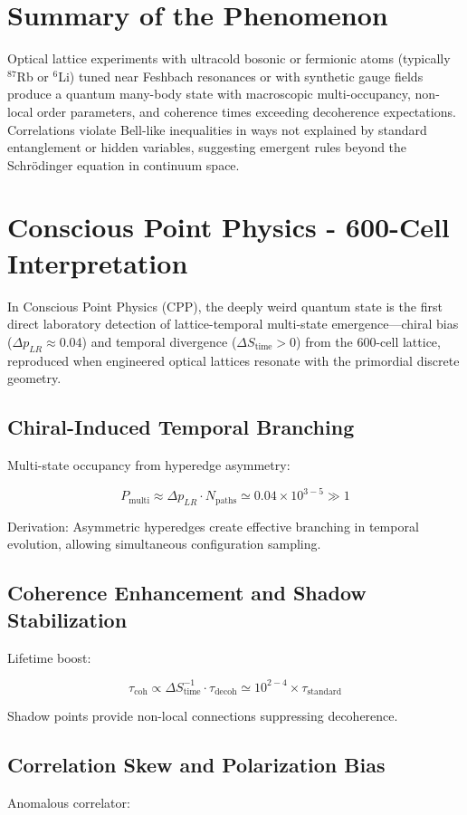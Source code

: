 \documentclass[11pt]{article}
\begin{document}
\section{Summary of the Phenomenon}
Optical lattice experiments with ultracold bosonic or fermionic atoms (typically $^{87}$Rb or $^{6}$Li) tuned near Feshbach resonances or with synthetic gauge fields produce a quantum many-body state with macroscopic multi-occupancy, non-local order parameters, and coherence times exceeding decoherence expectations. Correlations violate Bell-like inequalities in ways not explained by standard entanglement or hidden variables, suggesting emergent rules beyond the Schrödinger equation in continuum space.

\section{Conscious Point Physics - 600-Cell Interpretation}
In Conscious Point Physics (CPP), the deeply weird quantum state is the first direct laboratory detection of lattice-temporal multi-state emergence—chiral bias ($\Delta p_{LR} \approx 0.04$) and temporal divergence ($\Delta S_{\text{time}} > 0$) from the 600-cell lattice, reproduced when engineered optical lattices resonate with the primordial discrete geometry.

\subsection{Chiral-Induced Temporal Branching}
Multi-state occupancy from hyperedge asymmetry:

\[
P_{\text{multi}} \approx \Delta p_{LR} \cdot N_{\text{paths}} \simeq 0.04 \times 10^{3-5} \gg 1
\]

Derivation: Asymmetric hyperedges create effective branching in temporal evolution, allowing simultaneous configuration sampling.

\subsection{Coherence Enhancement and Shadow Stabilization}
Lifetime boost:

\[
\tau_{\text{coh}} \propto \Delta S_{\text{time}}^{-1} \cdot \tau_{\text{decoh}} \simeq 10^{2-4} \times \tau_{\text{standard}}
\]

Shadow points provide non-local connections suppressing decoherence.

\subsection{Correlation Skew and Polarization Bias}
Anomalous correlator:
\end{document}
